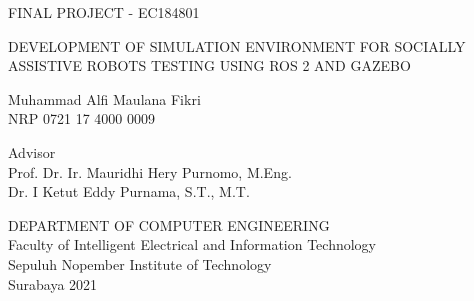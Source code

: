 FINAL PROJECT - EC184801

\vspace{6ex}

\begin{large}
  DEVELOPMENT OF SIMULATION ENVIRONMENT FOR SOCIALLY ASSISTIVE ROBOTS TESTING USING ROS 2 AND GAZEBO
\end{large}

\vspace{4ex}

Muhammad Alfi Maulana Fikri \\
NRP 0721 17 4000 0009

\vspace{2ex}

Advisor \\
Prof. Dr. Ir. Mauridhi Hery Purnomo, M.Eng. \\
Dr. I Ketut Eddy Purnama, S.T., M.T.

\vspace{6ex}

DEPARTMENT OF COMPUTER ENGINEERING \\
Faculty of Intelligent Electrical and Information Technology \\
Sepuluh Nopember Institute of Technology \\
Surabaya 2021
